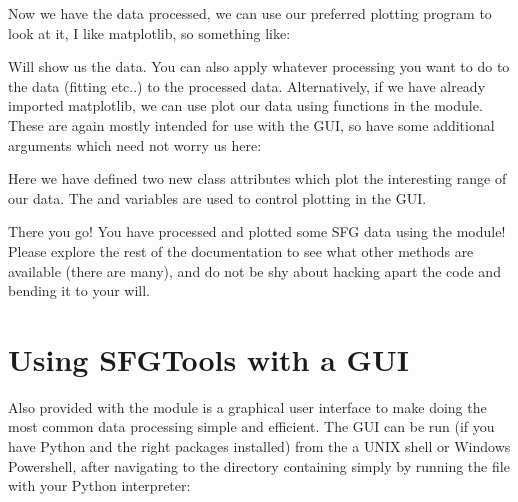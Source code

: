 \documentclass[a4paper,10pt,english]{sphinxmanual}
\begin{document}
\sphinxAtStartPar
Now we have the data processed, we can use our preferred plotting program to look at it, I like matplotlib, so something like:

\begin{sphinxVerbatim}[commandchars=\\\{\}]
   
 \PYG{p}{[}\PYG{p}{]}
\end{sphinxVerbatim}

\sphinxAtStartPar
Will show us the data. You can also apply whatever processing you want to do to the data (fitting etc..) to the processed data. Alternatively, if we have already imported matplotlib, we can use plot our data using functions in the module. These are again mostly intended for use with the GUI, so have some additional arguments which need not worry us here:

\begin{sphinxVerbatim}[commandchars=\\\{\}]
  
  
    
\end{sphinxVerbatim}

\sphinxAtStartPar
Here we have defined two new class attributes which plot the interesting range of our data. The  and  variables are used to control plotting in the GUI.

\sphinxAtStartPar
There you go! You have processed and plotted some SFG data using the  module! Please explore the rest of the documentation to see what other methods are available (there are many), and do not be shy about hacking apart the code and bending it to your will.


\chapter{Using SFGTools with a GUI}
\label{\detokenize{index:using-sfgtools-with-a-gui}}
\sphinxAtStartPar
Also provided with the  module is a graphical user interface to make doing the most common data processing simple and efficient. The GUI can be run (if you have Python and the right packages installed) from the a UNIX shell or Windows Powershell, after navigating to the directory containing  simply by running the file with your Python interpreter:
\end{document}
